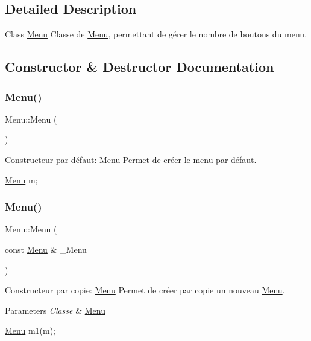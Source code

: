 \subsection{Detailed Description}
Class \hyperlink{classMenu}{Menu} Classe de \hyperlink{classMenu}{Menu}, permettant de gérer le nombre de boutons du menu. 

\subsection{Constructor \& Destructor Documentation}
\mbox{\label{classMenu_ad466dd83355124a6ed958430450bfe94}} 
\subsubsection{\texorpdfstring{Menu()}{Menu()}\hspace{0.1cm}{\footnotesize\ttfamily [1/3]}}
{\footnotesize\ttfamily Menu\+::\+Menu (\begin{DoxyParamCaption}{ }\end{DoxyParamCaption})}



Constructeur par défaut\+: \hyperlink{classMenu}{Menu} Permet de créer le menu par défaut. 


\begin{DoxyCode}
\hyperlink{classMenu}{Menu} m;
\end{DoxyCode}
 \mbox{\label{classMenu_a255104f828234493ca62a43d144d2573}} 
\subsubsection{\texorpdfstring{Menu()}{Menu()}\hspace{0.1cm}{\footnotesize\ttfamily [2/3]}}
{\footnotesize\ttfamily Menu\+::\+Menu (\begin{DoxyParamCaption}\item[{const \hyperlink{classMenu}{Menu} \&}]{\+\_\+\+Menu }\end{DoxyParamCaption})}



Constructeur par copie\+: \hyperlink{classMenu}{Menu} Permet de créer par copie un nouveau \hyperlink{classMenu}{Menu}. 


\begin{DoxyParams}{Parameters}
{\em Classe} & \hyperlink{classMenu}{Menu} 
\begin{DoxyCode}
\hyperlink{classMenu}{Menu} m1(m);
\end{DoxyCode}
 \\
\hline
\end{DoxyParams}
\mbox{\label{classMenu_a51e725eafe16d272ea48c377a1d3aeff}} 
